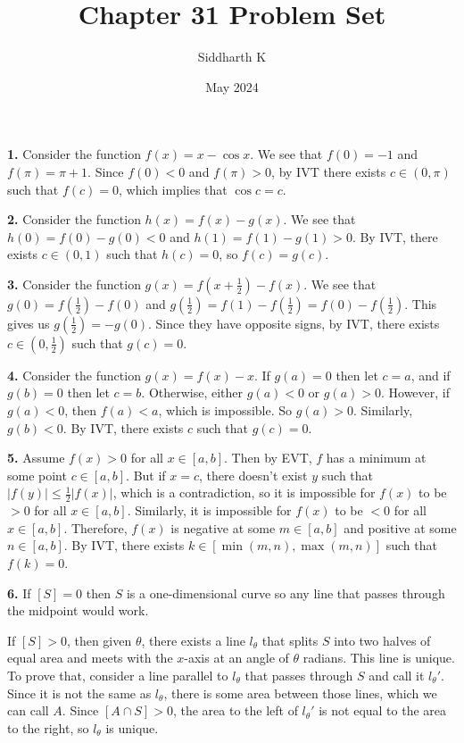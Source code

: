 \documentclass{article}
\title{Chapter 31 Problem Set}
\author{Siddharth K}
\date{May 2024}
\begin{document}
\maketitle

\textbf{1.} Consider the function $f(x) = x - \cos x$. We see that $f(0) = -1$ and $f(\pi) = \pi + 1$. Since $f(0) < 0$ and $f(\pi) > 0$, by IVT there exists $c \in (0, \pi)$ such that $f(c) = 0$, which implies that $\cos c = c$.
\newline

\textbf{2.} Consider the function $h(x) = f(x) - g(x)$. We see that $h(0) = f(0) - g(0) < 0$ and $h(1) = f(1) - g(1) > 0$. By IVT, there exists $c \in (0, 1)$ such that $h(c) = 0$, so $f(c) = g(c)$.
\newline

\textbf{3.} Consider the function $g(x) = f(x + \frac{1}{2}) - f(x)$. We see that $g(0) = f(\frac{1}{2}) - f(0)$ and $g(\frac{1}{2}) = f(1) - f(\frac{1}{2}) = f(0) - f(\frac{1}{2})$. This gives us $g(\frac{1}{2}) = -g(0)$. Since they have opposite signs, by IVT, there exists $c \in (0, \frac{1}{2})$ such that $g(c) = 0$.
\newline

\textbf{4.} Consider the function $g(x) = f(x) - x$. If $g(a) = 0$ then let $c = a$, and if $g(b) = 0$ then let $c = b$. Otherwise, either $g(a) < 0$ or $g(a) > 0$. However, if $g(a) < 0$, then $f(a) < a$, which is impossible. So $g(a) > 0$. Similarly, $g(b) < 0$. By IVT, there exists $c$ such that $g(c) = 0$.
\newline

\textbf{5.} Assume $f(x) > 0$ for all $x \in [a, b]$. Then by EVT, $f$ has a minimum at some point $c \in [a, b]$. But if $x = c$, there doesn't exist $y$ such that $|f(y)| \le \frac{1}{2}|f(x)|$, which is a contradiction, so it is impossible for $f(x)$ to be $> 0$ for all $x \in [a, b]$. Similarly, it is impossible for $f(x)$ to be $< 0$ for all $x \in [a, b]$. Therefore, $f(x)$ is negative at some $m \in [a, b]$ and positive at some $n \in [a, b]$. By IVT, there exists $k \in [\min(m, n), \max(m, n)]$ such that $f(k) = 0$.
\newline

\textbf{6.} If $[S] = 0$ then $S$ is a one-dimensional curve so any line that passes through the midpoint would work.
\newline

If $[S] > 0$, then given $\theta$, there exists a line $l_\theta$ that splits $S$ into two halves of equal area and meets with the $x$-axis at an angle of $\theta$ radians. This line is unique. To prove that, consider a line parallel to $l_\theta$ that passes through $S$ and call it $l_\theta '$. Since it is not the same as $l_\theta$, there is some area between those lines, which we can call $A$. Since $[A \cap S] > 0$, the area to the left of $l_\theta '$ is not equal to the area to the right, so $l_\theta$ is unique.
\newline
\end{document}

